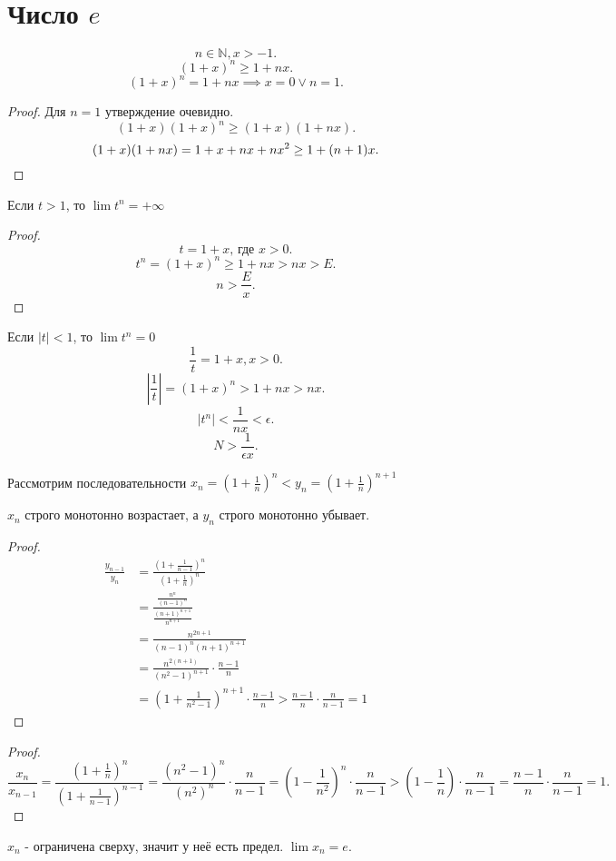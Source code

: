 \documentclass[11pt, oneside]{article}   	%
\begin{document}
\section{Число $e$}
\begin{theorem}
    \[ n\in \mathbb{N}, x>-1 .\]
    \[ (1+x)^{n}\ge 1+nx .\]
    \[ (1+x)^{n}=1+nx \implies x=0\lor n=1 .\] 
    \begin{proof}
        Для $n=1$ утверждение очевидно.\\
        \[ (1+x)(1+x)^{n} \ge (1+x)(1+nx) .\]
        \[ (1+x)(1+nx)= 1+x+nx+nx^2 \ge 1+(n+1)x . \qedhere\] 
    \end{proof}
\end{theorem}
\begin{tlemma}
    Если $t>1$, то  $\lim t^{n} = +\infty$ 
    \begin{proof}
        \[ t = 1+x\text{, где $x>0$} .\]
        \[ t^{n} = (1+x)^{n} \ge 1+nx>nx>E .\]
        \[ n>\frac{E}{x} .\] 
    \end{proof}
\end{tlemma}
\begin{tlemma}
    Если $|t|<1$, то  $\lim t^{n} = 0$ 
    \[ \frac{1}{t} = 1+x, x>0 .\]
    \[ |\frac{1}{t}|=(1+x)^{n}>1+nx>nx .\]
    \[ \left|t^n\right| < \frac{1}{nx}<\epsilon .\]
    \[ N > \frac{1}{\epsilon x} .\] 
\end{tlemma}
Рассмотрим последовательности $x_n = \left(1+\frac{1}{n}\right)^{n} < y_n = (1+\frac{1}{n})^{n+1}$ 
\begin{theorem}
    $x_n$ строго монотонно возрастает, а  $y_n$ строго монотонно убывает. 
    \begin{proof}
        \begin{equation*}
            \begin{split}
                \frac{y_{n-1}}{y_n} &= \frac{(1+\frac{1}{n-1})^{n}}{(1+\frac{1}{n})^{n}}\\
                &= \frac{\frac{n^{n}}{(n-1)^{n}}}{\frac{(n+1)^{n+1}}{n^{n+1}}}\\
                &= \frac{n^{2n+1}}{(n-1)^{n}(n+1)^{n+1}}\\ 
                &= \frac{n^{2(n+1)}}{(n^2-1)^{n+1}} \cdot \frac{n-1}{n}\\ 
                &= \left(1+\frac{1}{n^2-1}\right)^{n+1}\cdot \frac{n-1}{n} > \frac{n-1}{n}\cdot \frac{n}{n-1} = 1 
            \end{split}
        \end{equation*}
    \end{proof} 
    \begin{proof}
        \[ \frac{x_n}{x_{n-1}} = \frac{(1+\frac{1}{n})^{n}}{(1+\frac{1}{n-1})^{n-1}} = \frac{(n^2-1)^{n}}{(n^2)^{n}} \cdot \frac{n}{n-1} = (1-\frac{1}{n^2})^{n}\cdot \frac{n}{n-1} > (1-\frac{1}{n})\cdot \frac{n}{n-1} = \frac{n-1}{n}\cdot \frac{n}{n-1} = 1.\] 
    \end{proof}
    $x_n$ - ограничена сверху, значит у неё есть предел. $\lim x_n = e$.
\end{theorem}
\end{document}
